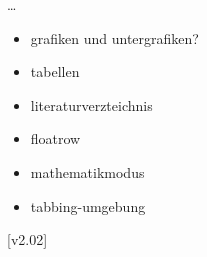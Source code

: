 \documentclass[english,ngerman]{tudscrartcl}
\begin{document}
\dots %
%
\FinishTutorial
\clearpage
  \begin{itemize}
  \item grafiken und untergrafiken?
  \item tabellen
  \item literaturverzteichnis
  \item floatrow
  \item mathematikmodus
  \item tabbing-umgebung
  \end{itemize}
\ListOfToDo
{}[v2.02]
\end{document}
